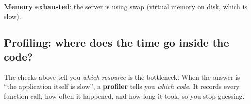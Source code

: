 \begin{codebox}[short]

\begin{Shaded}
\begin{Highlighting}[]
 \VariableTok{$(} \VariableTok{)} 
\end{Highlighting}
\end{Shaded}

\end{codebox}

\noindent{}\textbf{Memory exhausted}: the server is using swap (virtual memory on disk, which is slow).

\begin{codebox}[short]

\begin{Shaded}
\begin{Highlighting}[]
 
\end{Highlighting}
\end{Shaded}

\end{codebox}

\subsection*{Profiling: where does the time go inside the code?}\label{36-scaling-load:profiling-where-does-the-time-go-inside-the-code}

The checks above tell you \emph{which resource} is the bottleneck. When the answer is ``the application itself is slow'', a \textbf{profiler} tells you \emph{which code}. It records every function call, how often it happened, and how long it took, so you stop guessing.

